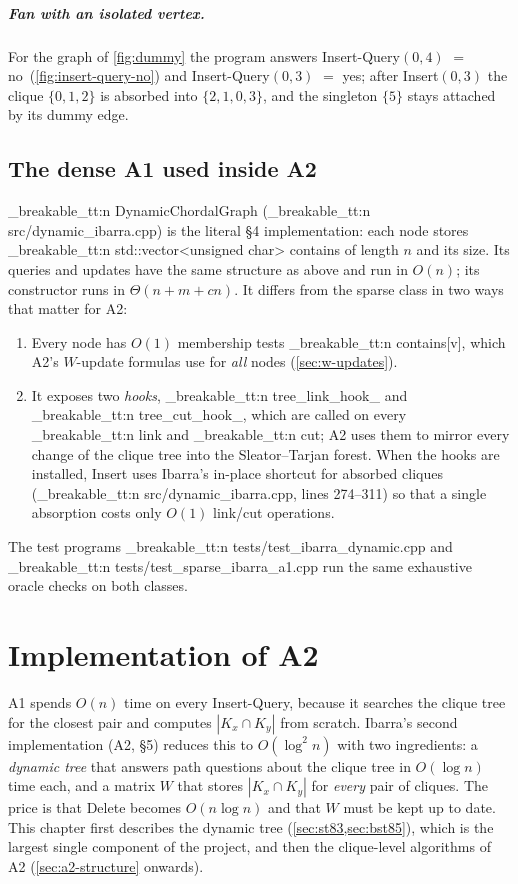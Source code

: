 \documentclass[11pt,a4paper,oneside]{report}
\theoremstyle{plain}
\theoremstyle{definition}
\theoremstyle{remark}
\newcommand{\yes}{\textsf{yes}}
\newcommand{\no}{\textsf{no}}
\newcommand{\op}[1]{\textsf{#1}}
\DeclareRobustCommand{\code}[1]{\mtp_breakable_tt:n {#1}}
\DeclareRobustCommand{\file}[1]{\mtp_breakable_tt:n {#1}}
\begin{document}
\paragraph{Fan with an isolated vertex.} For the graph of \cref{fig:dummy} the program answers
\op{Insert-Query}\((0,4)\) \(=\) \no\ (\cref{fig:insert-query-no}) and
\op{Insert-Query}\((0,3)\) \(=\) \yes; after \op{Insert}\((0,3)\) the clique \(\{0,1,2\}\) is
absorbed into \(\{2,1,0,3\}\), and the singleton \(\{5\}\) stays attached by its dummy edge.

\section{The dense A1 used inside A2}\label{sec:dense-a1}
\code{DynamicChordalGraph} (\file{src/dynamic_ibarra.cpp}) is the literal \S4 implementation:
each node stores \code{std::vector<unsigned char> contains} of length \(n\) and its size. Its
queries and updates have the same structure as above and run in \(O(n)\); its constructor runs
in \(\Theta(n+m+cn)\). It differs from the sparse class in two ways that matter for A2:
\begin{enumerate}
\item Every node has \(O(1)\) membership tests \code{contains[v]}, which A2's
  \(W\)-update formulas use for \emph{all} nodes (\cref{sec:w-updates}).
\item It exposes two \emph{hooks}, \code{tree_link_hook_} and \code{tree_cut_hook_}, which
  are called on every \code{link} and \code{cut}; A2 uses them to mirror every change of the
  clique tree into the Sleator--Tarjan forest. When the hooks are installed, \op{Insert} uses
  Ibarra's in-place shortcut for absorbed cliques (\file{src/dynamic_ibarra.cpp}, lines
  274--311) so that a single absorption costs only \(O(1)\) link/cut operations.
\end{enumerate}
The test programs \file{tests/test_ibarra_dynamic.cpp} and
\file{tests/test_sparse_ibarra_a1.cpp} run the same exhaustive oracle checks on both classes.
\chapter{Implementation of A2}\label{ch:a2}
A1 spends \(O(n)\) time on every \op{Insert-Query}, because it searches the clique tree for the
closest pair and computes \(|K_x\cap K_y|\) from scratch. Ibarra's second implementation (A2,
\S5) reduces this to \(O(\log^2 n)\) with two ingredients: a \emph{dynamic tree} that answers
path questions about the clique tree in \(O(\log n)\) time each, and a matrix \(W\) that stores
\(|K_x\cap K_y|\) for \emph{every} pair of cliques. The price is that \op{Delete} becomes
\(O(n\log n)\) and that \(W\) must be kept up to date. This chapter first describes the
dynamic tree (\cref{sec:st83,sec:bst85}), which is the largest single component of the project,
and then the clique-level algorithms of A2 (\cref{sec:a2-structure} onwards).
\end{document}
